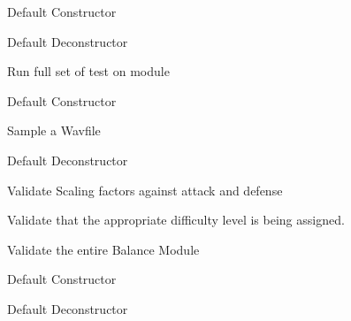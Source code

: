 \begin{DoxyRefList}
%
Default Constructor  
\item[Member \mbox{\hyperlink{classTestActors_ae59d6b6ef13a5da394b2b693473f1e5c}{Test\+Actors\+::$\sim$\+Test\+Actors}} ()]\label{todo__todo000177}%
%
Default Deconstructor  
\item[Member \mbox{\hyperlink{classTestAudio_af6341dff86d2f9e8246886bd102b6a2e}{Test\+Audio\+::test\+\_\+all}} ()]\label{todo__todo000179}%
%
Run full set of test on module  
\item[Member \mbox{\hyperlink{classTestAudio_acd4a863bd97aee52add9d8b071351720}{Test\+Audio\+::Test\+Audio}} ()]\label{todo__todo000178}%
%
Default Constructor  
\item[Member \mbox{\hyperlink{classTestAudio_a663e5db54398fa3ada1edc8e82bd98cc}{Test\+Audio\+::wav\+Sampling}} ()]\label{todo__todo000180}%
%
Sample a Wavfile  
\item[Member \mbox{\hyperlink{classTestAudio_a8c063c5a3ae7afe30c74535253fe46ad}{Test\+Audio\+::$\sim$\+Test\+Audio}} ()]\label{todo__todo000181}%
%
Default Deconstructor  
\item[Member \mbox{\hyperlink{classTestBalance_a41811f0ef5f82115aab85113d46d977a}{Test\+Balance\+::def\+\_\+atk\+\_\+ratio}} ()]\label{todo__todo000184}%
%
Validate Scaling factors against attack and defense  
\item[Member \mbox{\hyperlink{classTestBalance_a9221086b724b0d24f0d96a903f98adda}{Test\+Balance\+::difficulty\+\_\+level}} ()]\label{todo__todo000185}%
%
Validate that the appropriate difficulty level is being assigned.  
\item[Member \mbox{\hyperlink{classTestBalance_a80d8b0affa58a2c70d90cbf2bac8c517}{Test\+Balance\+::test\+\_\+all}} ()]\label{todo__todo000183}%
%
Validate the entire Balance Module  
\item[Member \mbox{\hyperlink{classTestBalance_a0b015a3d015cf1931552d46e19ac9734}{Test\+Balance\+::Test\+Balance}} ()]\label{todo__todo000182}%
%
Default Constructor  
\item[Member \mbox{\hyperlink{classTestBalance_a4c8c816b787fa576d8112b6677f5c27e}{Test\+Balance\+::$\sim$\+Test\+Balance}} ()]\label{todo__todo000186}%
%
Default Deconstructor  
\item[Member \mbox{\hyperlink{classTestBattle_a9233317fdb07fb927f83c22b811e4d9b}{Test\+Battle\+::level1\+\_\+eve}} ()]\label{todo__todo000192}%

\end{DoxyRefList}
